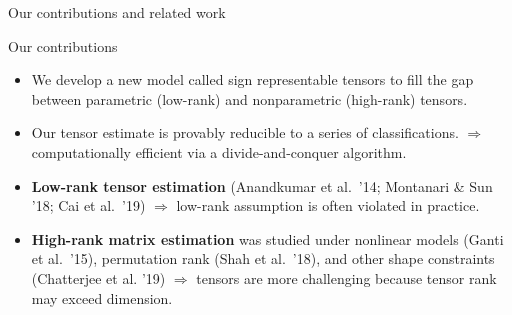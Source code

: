 \documentclass[10pt, mathserif]{beamer} %
\theoremstyle{definition}
\theoremstyle{plain}
\begin{document}
\begin{frame}{Our contributions and related work}

\begin{block}{Our contributions}
\begin{itemize}
\item <1-> We develop a new model called {\color{red} sign representable tensors} to fill the gap between parametric (low-rank) and nonparametric (high-rank) tensors. 
\item <2-> Our tensor estimate is {\color{red}provably reducible} to a series of classifications. $\Rightarrow$ computationally efficient via a divide-and-conquer algorithm. 
\end{itemize}
\end{block}
\pause


\begin{itemize}
\item <3-> {\bf Low-rank tensor estimation} (Anandkumar et al.\ '14; Montanari \& Sun '18; Cai et al.\ '19) $\Rightarrow$ {\color{red}low-rank assumption is often violated} in practice. 
\item <4-> {\bf High-rank matrix estimation} was studied under nonlinear models (Ganti et al.\ '15), permutation rank (Shah et al.\ '18), and other shape constraints (Chatterjee et al. '19) $\Rightarrow$ tensors are more challenging because {\color{red}tensor rank may exceed dimension}. 
\end{itemize}


\end{frame}
\end{document}
